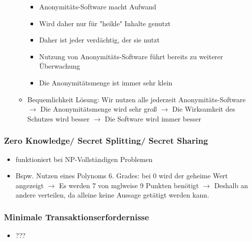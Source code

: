 \documentclass{article} %
\begin{document}
\begin{itemize}
\begin{itemize}
					\begin{itemize}
						\item Anonymitäts-Software macht Aufwand
						\item Wird daher nur für "heikle" Inhalte genutzt
						\item Daher ist jeder verdächtig, der sie nutzt
						\item Nutzung von Anonymitäts-Software führt bereits zu weiterer Überwachung
						\item Die Anonymitätsmenge ist immer sehr klein
					\end{itemize}
					\item Bequemlichkeit Lösung: Wir nutzen alle jederzeit Anonymitäts-Software $\rightarrow$ Die Anonymitätsmenge wird sehr groß  $\rightarrow$  Die Wirksamkeit des Schutzes wird besser $\rightarrow$ Die Software wird immer besser
				\end{itemize}
			\end{itemize}
			\subsubsection{Zero Knowledge/ Secret Splitting/ Secret Sharing}
			\begin{itemize} 
				\item funktioniert bei NP-Vollständigen Problemen
				\item Bspw. Nutzen eines Polynoms 6. Grades: bei 0 wird der geheime Wert angezeigt $\rightarrow$ Es werden 7 von mglweise 9 Punkten benötigt $\rightarrow$ Deshalb an andere verteilen, da alleine keine Aussage getätigt werden kann.
			\end{itemize}
			\subsubsection{Minimale Transaktionserfordernisse}
			\begin{itemize} 
				\item ???
			\end{itemize}
\end{document}
